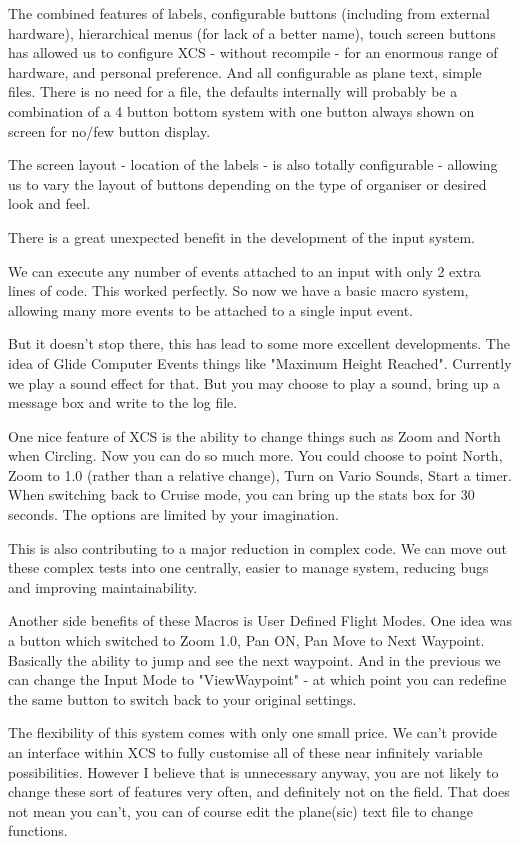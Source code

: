 The combined features of labels, configurable buttons (including from
external hardware), hierarchical menus (for lack of a better name),
touch screen buttons has allowed us to configure XCS - without
recompile - for an enormous range of hardware, and personal
preference.  And all configurable as plane text, simple files. There
is no need for a file, the defaults internally will probably be a
combination of a 4 button bottom system with one button always shown
on screen for no/few button display.

The screen layout - location of the labels - is also totally
configurable - allowing us to vary the layout of buttons depending on
the type of organiser or desired look and feel.

There is a great unexpected benefit in the development of the input
system.

We can execute any number of events attached to an input with only 2
extra lines of code. This worked perfectly. So now we have a basic
macro system, allowing many more events to be attached to a single
input event.

But it doesn't stop there, this has lead to some more excellent
developments. The idea of Glide Computer Events things like "Maximum
Height Reached". Currently we play a sound effect for that. But you
may choose to play a sound, bring up a message box and write to the
log file.

One nice feature of XCS is the ability to change things such as Zoom
and North when Circling. Now you can do so much more. You could choose
to point North, Zoom to 1.0 (rather than a relative change), Turn on
Vario Sounds, Start a timer. When switching back to Cruise mode, you
can bring up the stats box for 30 seconds. The options are limited by
your imagination.

This is also contributing to a major reduction in complex code. We can
move out these complex tests into one centrally, easier to manage
system, reducing bugs and improving maintainability.

Another side benefits of these Macros is User Defined Flight
Modes. One idea was a button which switched to Zoom 1.0, Pan ON, Pan
Move to Next Waypoint. Basically the ability to jump and see the next
waypoint. And in the previous we can change the Input Mode to
"ViewWaypoint" - at which point you can redefine the same button to
switch back to your original settings.

The flexibility of this system comes with only one small price. We
can't provide an interface within XCS to fully customise all of these
near infinitely variable possibilities. However I believe that is
unnecessary anyway, you are not likely to change these sort of
features very often, and definitely not on the field. That does not
mean you can't, you can of course edit the plane(sic) text file to
change functions.

